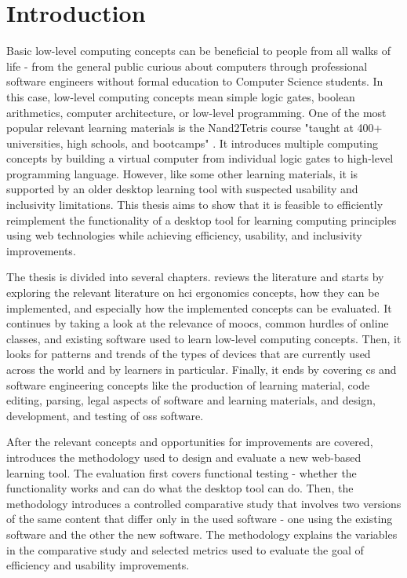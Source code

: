\chapter{Introduction}
\label{Introduction}

Basic low-level computing concepts can be beneficial to people from all walks of life - from the general public curious about computers through professional software engineers without formal education to Computer Science students.
In this case, low-level computing concepts mean simple logic gates, boolean arithmetics, computer architecture, or low-level programming.
One of the most popular relevant learning materials is the Nand2Tetris course "taught at 400+ universities, high schools, and bootcamps" \parencite{nand2tetrisweb}.
It introduces multiple computing concepts by building a virtual computer from individual logic gates to high-level programming language.
However, like some other learning materials, it is supported by an older desktop learning tool with suspected usability and inclusivity limitations.
This thesis aims to show that it is feasible to efficiently reimplement the functionality of a desktop tool for learning computing principles using web technologies while achieving efficiency, usability, and inclusivity improvements.

The thesis is divided into several chapters.
 reviews the literature and starts by exploring the relevant literature on \gls{hci} ergonomics concepts, how they can be implemented, and especially how the implemented concepts can be evaluated.
It continues by taking a look at the relevance of \glspl{mooc}, common hurdles of online classes, and existing software used to learn low-level computing concepts.
Then, it looks for patterns and trends of the types of devices that are currently used across the world and by learners in particular.
Finally, it ends by covering \gls{cs} and software engineering concepts like the production of learning material, code editing, parsing, legal aspects of software and learning materials, and design, development, and testing of \gls{oss} software.

After the relevant concepts and opportunities for improvements are covered,  introduces the methodology used to design and evaluate a new web-based learning tool.
The evaluation first covers functional testing - whether the functionality works and can do what the desktop tool can do.
Then, the methodology introduces a controlled comparative study that involves two versions of the same content that differ only in the used software - one using the existing software and the other the new software.
The methodology explains the variables in the comparative study and selected metrics used to evaluate the goal of efficiency and usability improvements.

